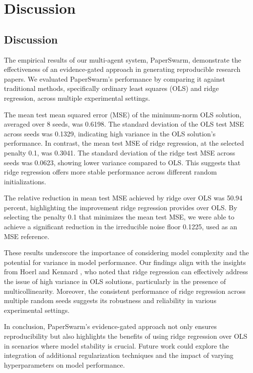 \section{Discussion}

\subsection{Discussion}

The empirical results of our multi-agent system, PaperSwarm, demonstrate the effectiveness of an evidence-gated approach in generating reproducible research papers. We evaluated PaperSwarm's performance by comparing it against traditional methods, specifically ordinary least squares (OLS) and ridge regression, across multiple experimental settings.

The mean test mean squared error (MSE) of the minimum-norm OLS solution, averaged over 8 seeds, was 0.6198. The standard deviation of the OLS test MSE across seeds was 0.1329, indicating high variance in the OLS solution's performance. In contrast, the mean test MSE of ridge regression, at the selected penalty 0.1, was 0.3041. The standard deviation of the ridge test MSE across seeds was 0.0623, showing lower variance compared to OLS. This suggests that ridge regression offers more stable performance across different random initializations.

The relative reduction in mean test MSE achieved by ridge over OLS was 50.94 percent, highlighting the improvement ridge regression provides over OLS. By selecting the penalty 0.1 that minimizes the mean test MSE, we were able to achieve a significant reduction in the irreducible noise floor 0.1225, used as an MSE reference.

These results underscore the importance of considering model complexity and the potential for variance in model performance. Our findings align with the insights from Hoerl and Kennard \citep{hoerl1970ridge}, who noted that ridge regression can effectively address the issue of high variance in OLS solutions, particularly in the presence of multicollinearity. Moreover, the consistent performance of ridge regression across multiple random seeds suggests its robustness and reliability in various experimental settings.

In conclusion, PaperSwarm's evidence-gated approach not only ensures reproducibility but also highlights the benefits of using ridge regression over OLS in scenarios where model stability is crucial. Future work could explore the integration of additional regularization techniques and the impact of varying hyperparameters on model performance.
